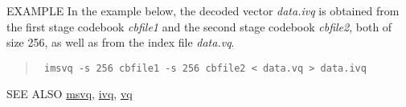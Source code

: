 \begin{options}
\end{options}

\begin{qsection}{EXAMPLE}
In the example below,
the decoded vector {\em data.ivq} is obtained
from the first stage codebook {\em cbfile1}
and the second stage codebook {\em cbfile2},
both of size 256, as well as from the index file {\em data.vq}.
\begin{quote}
\verb! imsvq -s 256 cbfile1 -s 256 cbfile2 < data.vq > data.ivq!
\end{quote}
\end{qsection}

\begin{qsection}{SEE ALSO}
\hyperlink{msvq}{msvq},
\hyperlink{ivq}{ivq},
\hyperlink{vq}{vq}
\end{qsection}
